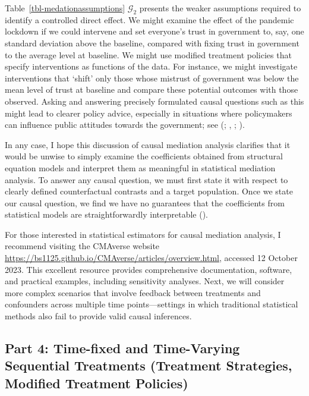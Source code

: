 \documentclass[
  single column]{article}
\begin{document}
Table~\ref{tbl-medationassumptions} \(\mathcal{G}_2\) presents the
weaker assumptions required to identify a controlled direct effect. We
might examine the effect of the pandemic lockdown if we could intervene
and set everyone's trust in government to, say, one standard deviation
above the baseline, compared with fixing trust in government to the
average level at baseline. We might use modified treatment policies that
specify interventions as functions of the data. For instance, we might
investigate interventions that `shift' only those whose mistrust of
government was below the mean level of trust at baseline and compare
these potential outcomes with those observed. Asking and answering
precisely formulated causal questions such as this might lead to clearer
policy advice, especially in situations where policymakers can influence
public attitudes towards the government; see
(;
,
; ).

In any case, I hope this discussion of causal mediation analysis
clarifies that it would be unwise to simply examine the coefficients
obtained from structural equation models and interpret them as
meaningful in statistical mediation analysis. To answer any causal
question, we must first state it with respect to clearly defined
counterfactual contrasts and a target population. Once we state our
causal question, we find we have no guarantees that the coefficients
from statistical models are straightforwardly interpretable
().

For those interested in statistical estimators for causal mediation
analysis, I recommend visiting the CMAverse website
\url{https://bs1125.github.io/CMAverse/articles/overview.html}, accessed
12 October 2023. This excellent resource provides comprehensive
documentation, software, and practical examples, including sensitivity
analyses. Next, we will consider more complex scenarios that involve
feedback between treatments and confounders across multiple time
points---settings in which traditional statistical methods also fail to
provide valid causal inferences.

\subsection{Part 4: Time-fixed and Time-Varying Sequential Treatments
(Treatment Strategies, Modified Treatment Policies)}\label{id-sec-4}
\end{document}

